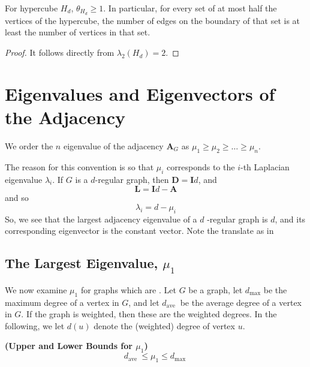 \documentclass{article}
\newcommand{\bsl}[1]{\boldsymbol{#1}}
\newcommand{\bfs}[1]{\textbf{({#1}) }}
\begin{document}
\begin{cora}
For hypercube $H_d$, $\theta_{H_{d}} \geq 1$.
In particular, for every set of at most half the vertices of the hypercube, the number of edges on the boundary of that set is at least the number of vertices in that set.
\end{cora}
\begin{proof}
It follows directly from $\lambda_2(H_d) =2$.
\end{proof}


\section{Eigenvalues and Eigenvectors of the Adjacency}
We order the $n$ eigenvalue of the adjacency $\bsl{A}_G$ as $\mu_1\ge \mu_2\ge\ldots \ge \mu_n$. 
\begin{rema}
The reason for this convention is so that $\mu_{i}$ corresponds to the $i$-th Laplacian eigenvalue $\lambda_{i} .$ If $G$ is a $d$-regular graph, then $\boldsymbol{D}=\boldsymbol{I} d$, and
$$
\boldsymbol{L}=\boldsymbol{I} d-\boldsymbol{A}
$$
and so
$$
\lambda_{i}=d-\mu_{i}
$$
So, we see that the largest adjacency eigenvalue of a $d$ -regular graph is $d$, and its corresponding eigenvector is the constant vector. Note the translate as in \cite[Page57]{horn2012matrix} 
\end{rema}

\subsection{The Largest Eigenvalue, $\mu_{1}$}
We now examine $\mu_{1}$ for graphs which are . Let $G$ be a graph, let $d_{\max }$ be the maximum degree of a vertex in $G$, and let $d_{\text {ave }}$ be the average degree of a vertex in $G$. If the graph is weighted, then these are the weighted degrees. In the following, we let $d(u)$ denote the (weighted) degree of vertex $u$.
\begin{lema}{\bfs{Upper and Lower Bounds for $\mu_1$}}
 $$
d_{\text {ave }} \leq \mu_{1} \leq d_{\text {max }}
$$
\end{lema}
\end{document}

